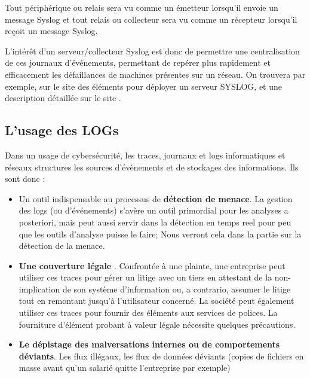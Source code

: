 Tout périphérique ou relais sera vu comme un émetteur lorsqu'il envoie un message Syslog et tout relais ou collecteur sera vu comme un récepteur lorsqu'il reçoit un message Syslog.

L'intérêt d'un serveur/collecteur Syslog est donc de permettre une centralisation de ces journaux d'événements, permettant de repérer plus rapidement et efficacement les défaillances de machines présentes sur un réseau. On trouvera par exemple, sur le site 
 des éléments pour déployer un serveur SYSLOG, et une description détaillée sur le site .

 \subsection{L'usage des LOGs}
 
 
 Dans un usage de cybersécurité, les traces, journaux et logs informatiques et réseaux structures les sources d'évènements et de stockages des informations. Ils sont donc :
 
 \begin{itemize}

   \item Un outil indispensable au processus de \textbf{détection de menace}. La gestion des logs (ou d’événements) s’avère un outil primordial pour les analyses a posteriori, mais peut aussi servir dans la détection en temps reel pour peu que les outils d'analyse puisse le faire; Nous verront cela dans la partie sur la détection de la menace.

   \item  \textbf{Une couverture légale }. Confrontée à une plainte, une entreprise peut utiliser ces traces pour gérer un litige avec un tiers  en attestant de la non-implication de son système d’information ou, a contrario, assumer le litige tout en remontant jusqu’à l’utilisateur concerné. La société peut également utiliser ces traces pour fournir des éléments aux services de polices. La fourniture d'élément probant à valeur légale nécessite quelques précautions. 

   \item  \textbf{Le dépistage des malversations internes ou de comportements déviants}. Les flux illégaux, les flux de données déviants (copies de fichiers en masse avant qu'un salarié quitte l'entreprise par exemple)

\end{itemize}

